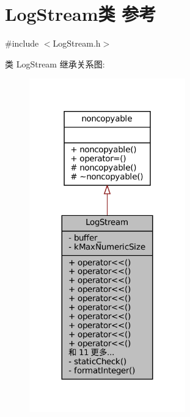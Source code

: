\hypertarget{classmuduo_1_1LogStream}{}\section{Log\+Stream类 参考}
\label{classmuduo_1_1LogStream}


{\ttfamily \#include $<$Log\+Stream.\+h$>$}



类 Log\+Stream 继承关系图\+:
\nopagebreak
\begin{figure}[H]
\begin{center}
\leavevmode
\includegraphics[width=191pt]{classmuduo_1_1LogStream__inherit__graph}
\end{center}
\end{figure}


